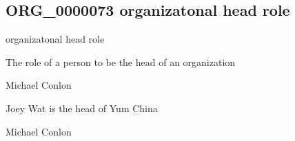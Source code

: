 \documentclass[letterpaper,10pt,english]{sphinxmanual}
\begin{document}
\subsection{ORG\_0000073 \sphinxhyphen{} organizatonal head role}
\label{\detokenize{doc-ORG_0000073:org-0000073-organizatonal-head-role}}\label{\detokenize{doc-ORG_0000073:index-0}}\label{\detokenize{doc-ORG_0000073::doc}}
\begin{sphinxShadowBox}

\sphinxAtStartPar
organizatonal head role
\end{sphinxShadowBox}

\begin{sphinxShadowBox}

\sphinxAtStartPar
{\hyperref[\detokenize{doc-BFO_0000023::doc}]{}}
\end{sphinxShadowBox}

\begin{sphinxShadowBox}

\sphinxAtStartPar
The role of a person to be the head of an organization
\end{sphinxShadowBox}

\begin{sphinxShadowBox}

\sphinxAtStartPar
Michael Conlon 
\end{sphinxShadowBox}

\begin{sphinxShadowBox}

\sphinxAtStartPar
Joey Wat is the head of Yum China
\end{sphinxShadowBox}

\begin{sphinxShadowBox}

\sphinxAtStartPar
Michael Conlon 
\end{sphinxShadowBox}
\begin{quote}

\ignorespaces \end{quote}
\end{document}
